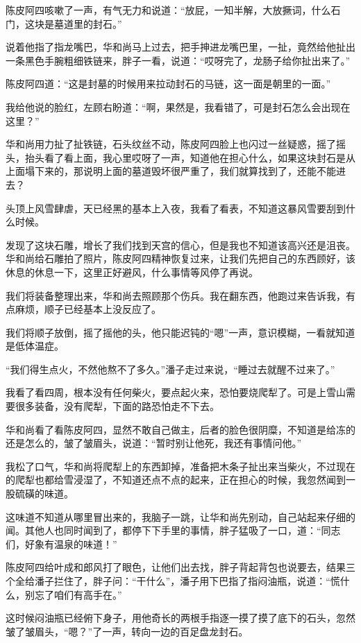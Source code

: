 陈皮阿四咳嗽了一声，有气无力和说道：“放屁，一知半解，大放撅词，什么石门，这块是墓道里的封石。”

说着他指了指龙嘴巴，华和尚马上过去，把手抻进龙嘴巴里，一扯，竟然给他扯出一条黑色手腕粗细铁链来，胖子一看，说道：“哎呀完了，龙肠子给你扯出来了。”

陈皮阿四道：“这是封墓的时候用来拉动封石的马链，这一面是朝里的一面。”

我给他说的脸红，左顾右盼道：“啊，果然是，我看错了，可是封石怎么会出现在这里？”

华和尚用力扯了扯铁链，石头纹丝不动，陈皮阿四脸上也闪过一丝疑惑，摇了摇头，抬头看了看上面，我心里哎呀了一声，知道他在担心什么，如果这块封石是从上面塌下来的，那说明上面的墓道毁坏很严重了，我们就算找到了，还能不能进去？

头顶上风雪肆虐，天已经黑的基本上入夜，我看了看表，不知道这暴风雪要刮到什么时候。

发现了这块石雕，增长了我们找到天宫的信心，但是我也不知道该高兴还是沮丧。华和尚给石雕拍了照片，陈皮阿四精神恢复过来，让我们先把自己的东西顾好，该休息的休息一下，这里正好避风，什么事情等风停了再说。

我们将装备整理出来，华和尚去照顾那个伤兵。我在翻东西，他跑过来告诉我，有点麻烦，顺子已经基本上没反应了。

我们将顺子放倒，摇了摇他的头，他只能迟钝的“嗯”一声，意识模糊，一看就知道是低体温症。

“我们得生点火，不然他熬不了多久。”潘子走过来说，“睡过去就醒不过来了。”

我看了看四周，根本没有任何柴火，要点起火来，恐怕要烧爬犁了。可是上雪山需要很多装备，没有爬犁，下面的路恐怕走不下去。

华和尚看了看陈皮阿四，显然不敢自己做主，后者的脸色很阴糜，不知道是给冻的还是怎么的，皱了皱眉头，说道：“暂时别让他死，我还有事情问他。”

我松了口气，华和尚将爬犁上的东西卸掉，准备把木条子扯出来当柴火，不过现在的爬犁也都给雪浸湿了，不知道还点不点的起来，正在担心的时候，我忽然闻到一股硫磺的味道。

这味道不知道从哪里冒出来的，我脑子一跳，让华和尚先别动，自己站起来仔细的闻。其他人也同时闻到了，都停下下手里的事情，胖子猛吸了一口，道：“同志们，好象有温泉的味道！”

陈皮阿四给叶成和郎风打了眼色，让他们出去找，胖子背起背包也说要去，结果三个全给潘子拦住了，胖子问：“干什么”，潘子用下巴指了指闷油瓶，说道：“慌什么，别忘了咱们有高手在。”

这时候闷油瓶已经俯下身子，用他奇长的两根手指逐一摸了摸了底下的石头，忽然皱了皱眉头，“嗯？”了一声，转向一边的百足盘龙封石。

